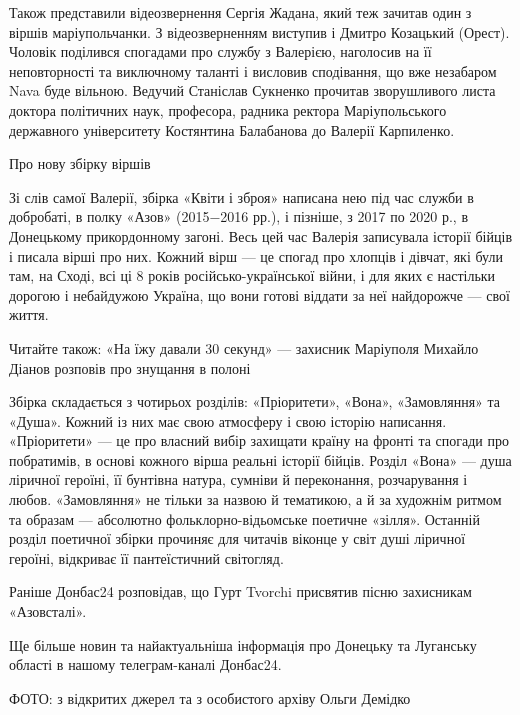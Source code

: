 Також представили відеозвернення Сергія Жадана, який теж зачитав один з віршів
маріупольчанки. З відеозверненням виступив і Дмитро Козацький (Орест). Чоловік
поділився спогадами про службу з Валерією, наголосив на її неповторності та
виключному таланті і висловив сподівання, що вже незабаром Nava буде вільною.
Ведучий Станіслав Сукненко прочитав зворушливого листа доктора політичних наук,
професора, радника ректора Маріупольського державного університету Костянтина
Балабанова до Валерії Карпиленко. 

Про нову збірку віршів

Зі слів самої Валерії, збірка «Квіти і зброя» написана нею під час служби в
добробаті, в полку «Азов» (2015−2016 рр.), і пізніше, з 2017 по 2020 р., в
Донецькому прикордонному загоні. Весь цей час Валерія записувала історії бійців
і писала вірші про них. Кожний вірш — це спогад про хлопців і дівчат, які були
там, на Сході, всі ці 8 років російсько-української війни, і для яких є
настільки дорогою і небайдужою Україна, що вони готові віддати за неї
найдорожче — свої життя.

Читайте також: «На їжу давали 30 секунд» — захисник Маріуполя Михайло Діанов розповів про знущання в полоні

Збірка складається з чотирьох розділів: «Пріоритети», «Вона», «Замовляння» та
«Душа». Кожний із них має свою атмосферу і свою історію написання. «Пріоритети»
— це про власний вибір захищати країну на фронті та спогади про побратимів, в
основі кожного вірша реальні історії бійців. Розділ «Вона» — душа ліричної
героїні, її бунтівна натура, сумніви й переконання, розчарування і любов.
«Замовляння» не тільки за назвою й тематикою, а й за художнім ритмом та образам
— абсолютно фольклорно-відьомське поетичне «зілля». Останній розділ поетичної
збірки прочиняє для читачів віконце у світ душі ліричної героїні, відкриває її
пантеїстичний світогляд.

Раніше Донбас24 розповідав, що Гурт Tvorchi присвятив пісню захисникам
«Азовсталі».

Ще більше новин та найактуальніша інформація про Донецьку та Луганську області
в нашому телеграм-каналі Донбас24.

ФОТО: з відкритих джерел та з особистого архіву Ольги Демідко
